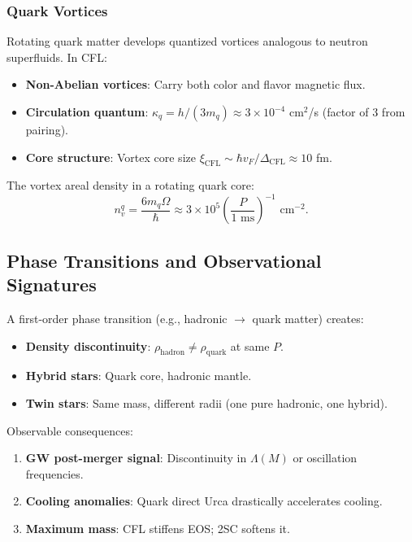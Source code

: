 \documentclass[12pt,a4paper]{article}
\theoremstyle{definition}
\theoremstyle{remark}
\begin{document}
\subsubsection{Quark Vortices}

Rotating quark matter develops quantized vortices analogous to neutron superfluids. In CFL:
\begin{itemize}
\item \textbf{Non-Abelian vortices}: Carry both color and flavor magnetic flux.
\item \textbf{Circulation quantum}: $\kappa_q = h/(3m_q) \approx 3 \times 10^{-4}$ cm$^2$/s (factor of 3 from pairing).
\item \textbf{Core structure}: Vortex core size $\xi_{\text{CFL}} \sim \hbar v_F/\Delta_{\text{CFL}} \approx 10$ fm.
\end{itemize}

The vortex areal density in a rotating quark core:
\begin{equation}
n_v^q = \frac{6m_q \Omega}{\hbar} \approx 3 \times 10^5 \left(\frac{P}{1 \text{ ms}}\right)^{-1} \text{ cm}^{-2}.
\end{equation}

\subsection{Phase Transitions and Observational Signatures}

A first-order phase transition (e.g., hadronic $\to$ quark matter) creates:
\begin{itemize}
\item \textbf{Density discontinuity}: $\rho_{\text{hadron}} \neq \rho_{\text{quark}}$ at same $P$.
\item \textbf{Hybrid stars}: Quark core, hadronic mantle.
\item \textbf{Twin stars}: Same mass, different radii (one pure hadronic, one hybrid).
\end{itemize}

Observable consequences:
\begin{enumerate}
\item \textbf{GW post-merger signal}: Discontinuity in $\Lambda(M)$ or oscillation frequencies.
\item \textbf{Cooling anomalies}: Quark direct Urca drastically accelerates cooling.
\item \textbf{Maximum mass}: CFL stiffens EOS; 2SC softens it.
\end{enumerate}
\end{document}
